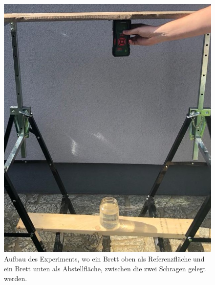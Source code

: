 \documentclass[11pt,ngerman]{scrartcl}
\begin{document}
\begin{figure}[H]
    \centering
    \begin{minipage}[htbp]{\linewidth}
        \begin{minipage}[htbp]{.45\linewidth} %
            \includegraphics[width=\linewidth]{pics/aufbau1.jpeg}
        \caption[Aufbau des Experiments]{Aufbau des Experiments, wo ein Brett
            oben als Referenzfläche und ein Brett unten als Abstellfläche, zwischen
            die zwei Schragen gelegt werden.
        }
        \label{fig:aufbau}
        \end{minipage}
        \begin{minipage}[htbp]{.54\linewidth} %

\end{minipage}
\end{minipage}
\end{figure}
\end{document}
